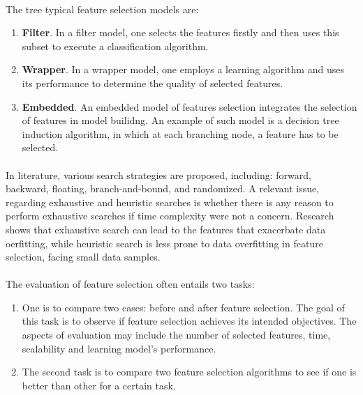 \documentclass[10pt]{article}\usepackage[]{graphicx}\usepackage[]{color}
\begin{document}
\paragraph{}
The tree typical feature selection models are:
\begin{enumerate}
\item \textbf{Filter}. In a filter model, one selects the features firstly and then uses this subset to execute a classification algorithm. 
\item \textbf{Wrapper}. In a wrapper model, one employs a learning algorithm and uses its performance to determine the quality of selected features. 
\item \textbf{Embedded}. An embedded model of features selection integrates the selection of features in model builidng. An example of such model is a decision tree induction algorithm, in which at each branching node, a feature has to be selected. 
\end{enumerate}

\paragraph{}
In literature, various search strategies are proposed, including: forward, backward, floating, branch-and-bound, and randomized. A relevant issue, regarding exhaustive and heuristic searches is whether there is any reason to perform exhaustive searches if time complexity were not a concern. Research shows that exhaustive search can lead to the features that exacerbate data oerfitting, while heuristic search is less prone to data overfitting in feature selection, facing small data samples.

\paragraph{}
The evaluation of feature selection often entails two tasks: 
\begin{enumerate}
\item One is to compare two cases: before and after feature selection. The goal of this task is to observe if feature selection achieves its intended objectives. The aspects of evaluation may include the number of selected features, time, scalability and learning model's performance. 
\item The second task is to compare two feature selection algorithms to see if one is better than other for a certain task. 
\end{enumerate}
\end{document}
